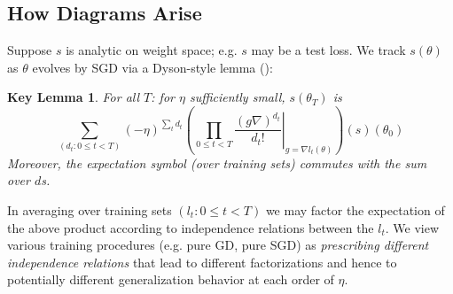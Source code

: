 \documentclass{article}
\newtheorem*{klem*}{Key Lemma}
\begin{document}
    \subsection{How Diagrams Arise}
        Suppose $s$ is analytic on weight space; e.g. $s$ may be a test loss.
        We track $s(\theta)$ as $\theta$ evolves by SGD via a Dyson-style
        lemma ():
        \begin{klem*} %
            For all $T$: for $\eta$ sufficiently small, $s(\theta_T)$ is
            \begin{equation}\label{eq:dyson}
                \sum_{(d_t: 0\leq t<T)}
                (-\eta)^{\sum_t d_t}
                \left(
                    \prod_{0 \leq t < T}
                        \left.
                            \frac{(g \nabla)^{d_t}}{d_t!}
                        \right|_{g=\nabla l_t(\theta)}
                \right)
                (s) (\theta_0)
            \end{equation}
            Moreover, the expectation symbol (over training sets) commutes with
            the sum over $d$s.
        \end{klem*}
        In averaging over training sets $(l_t: 0\leq t<T)$ we may factor the
        expectation of the above product according to independence relations
        between the $l_t$.  We view various training procedures (e.g. pure GD,
        pure SGD) as \emph{prescribing different independence relations} that
        lead to different factorizations and hence to potentially different
        generalization behavior at each order of $\eta$.
    
\end{document}
